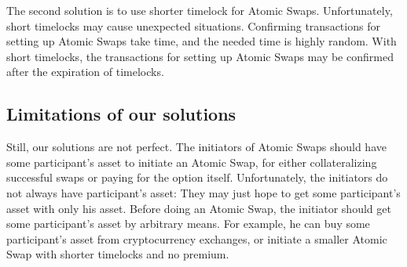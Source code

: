 The second solution is to use shorter timelock for Atomic Swaps.
Unfortunately, short timelocks may cause unexpected situations.
Confirming transactions for setting up Atomic Swaps take time, and the needed time is highly random.
With short timelocks, the transactions for setting up Atomic Swaps may be confirmed after the expiration of timelocks.


\subsection{Limitations of our solutions}

Still, our solutions are not perfect.
The initiators of Atomic Swaps should have some participant's asset to initiate an Atomic Swap,
for either collateralizing successful swaps or paying for the option itself.
Unfortunately, the initiators do not always have participant's asset: They may just hope to get some participant's asset with only his asset.
Before doing an Atomic Swap, the initiator should get some participant's asset by arbitrary means.
For example, he can buy some participant's asset from cryptocurrency exchanges, or initiate a smaller Atomic Swap with shorter timelocks and no premium.